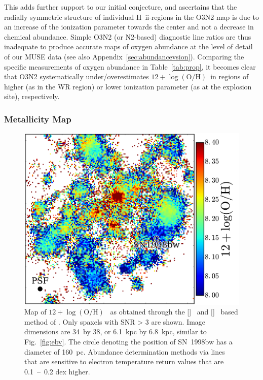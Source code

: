 \documentclass[traditabstract, referee]{aa}
\newcommand{\hii}{\mbox{H~{\sc ii}}}
\newcommand{\oh}{12+\log(\mathrm{O/H})}
\newcommand{\sii}{[\ion{S}{ii}]}
\newcommand{\nii}{[\ion{N}{ii}]}
\begin{document}
This adds further support to our initial conjecture, and ascertains that the radially symmetric structure of individual \hii-regions in the O3N2 map is due to an increase of the ionization parameter towards the center and not a decrease in chemical abundance. Simple O3N2 (or N2-based) diagnostic line ratios are thus inadequate to produce accurate maps of oxygen abundance at the level of detail of our MUSE data (see also Appendix~\ref{sec:abundancevsion}). Comparing the specific measurements of oxygen abundance in Table~\ref{tab:prop}, it becomes clear that O3N2 systematically under/overestimates $\oh$~in regions of higher (as in the WR region) or lower ionization parameter (as at the explosion site), respectively.

\subsubsection{Metallicity Map}
\label{sec:mapoh}

\begin{figure}
\includegraphics[angle=0, width=0.99\columnwidth]{Figs/MUSE_SN1998bw_OH.pdf}
\caption{Map of $\oh$~ as obtained through the \sii~ and \nii~ based method of \citet{2016Ap&SS.361...61D}. Only spaxels with {SNR > 3} are shown. Image dimensions are 34\arcsec~by 38\arcsec, or 6.1~kpc by 6.8~kpc, similar to Fig.~\ref{fig:ebv}. The circle denoting the position of SN~1998bw has a diameter of 160~pc. Abundance determination methods via lines that are sensitive to electron temperature return values that are 0.1~--~0.2 dex higher.}
\label{fig:s2}
\end{figure}
\end{document}
